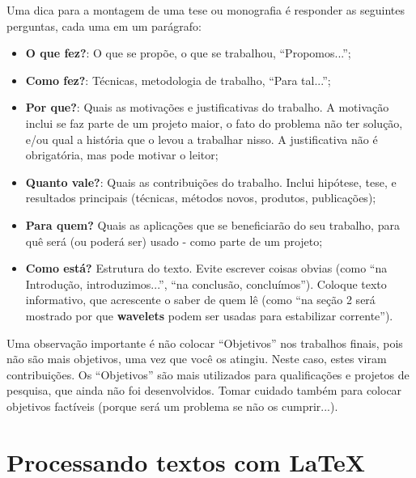 Uma dica para a montagem de uma tese ou monografia é responder as seguintes perguntas, cada uma em um parágrafo:
\begin{itemize}
	\item \textbf{O que fez?}: O que se propõe, o que se trabalhou, ``Propomos...'';
	\item \textbf{Como fez?}: Técnicas, metodologia de trabalho, ``Para tal...'';
	\item \textbf{Por que?}: Quais as motivações e justificativas do trabalho. A motivação inclui se faz parte de um projeto maior, o fato do problema não ter solução, e/ou qual a história que o levou a trabalhar nisso. A justificativa não é obrigatória, mas pode motivar o leitor;
	\item \textbf{Quanto vale?}: Quais as contribuições do trabalho. Inclui hipótese, tese,  e resultados principais (técnicas, métodos novos, produtos, publicações);
	\item \textbf{Para quem?} Quais as aplicações que se beneficiarão do seu trabalho, para quê será (ou poderá ser) usado - como parte de um projeto;
	\item \textbf{Como está?} Estrutura do texto. Evite escrever coisas obvias (como ``na Introdução, introduzimos...'', ``na conclusão, concluímos''). Coloque texto informativo, que acrescente o saber de quem lê (como ``na seção 2 será mostrado por que \textbf{wavelets} podem ser usadas para estabilizar corrente'').
\end{itemize}

Uma observação importante é não colocar ``Objetivos'' nos trabalhos finais, pois não são mais objetivos, uma vez que você os atingiu. Neste caso, estes viram contribuições. Os ``Objetivos'' são mais utilizados para qualificações e projetos de pesquisa, que ainda não foi desenvolvidos. Tomar cuidado também para colocar objetivos factíveis (porque será um problema se não os cumprir...).

\section{Processando textos com \LaTeX}

